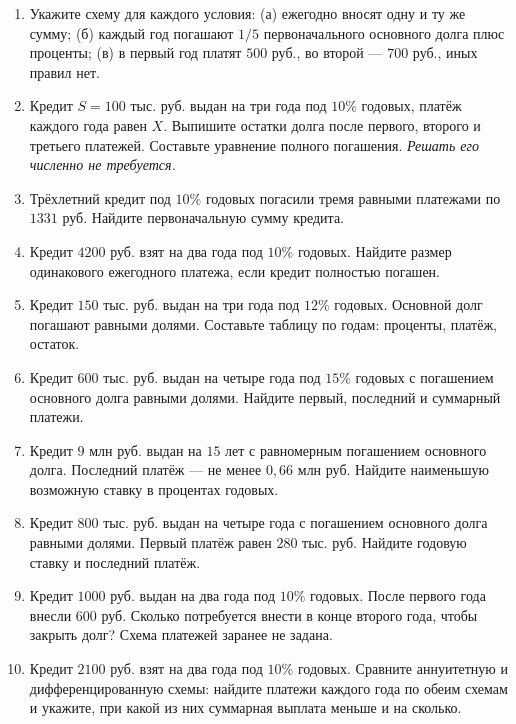 \documentclass[a4paper,12pt]{article}
\begin{document}
\begin{enumerate}[label=\textbf{\arabic*.},leftmargin=8mm,itemsep=8pt]
\item Укажите схему для каждого условия: (а) ежегодно вносят одну и ту же сумму; (б) каждый год погашают $1/5$ первоначального основного долга плюс проценты; (в) в первый год платят $500$ руб., во второй --- $700$ руб., иных правил нет.

\item Кредит $S=100$ тыс. руб. выдан на три года под $10\%$ годовых, платёж каждого года равен $X$. Выпишите остатки долга после первого, второго и третьего платежей. Составьте уравнение полного погашения. \textit{Решать его численно не требуется.}

\item Трёхлетний кредит под $10\%$ годовых погасили тремя равными платежами по $1331$ руб. Найдите первоначальную сумму кредита.

\item Кредит $4200$ руб. взят на два года под $10\%$ годовых. Найдите размер одинакового ежегодного платежа, если кредит полностью погашен.

\item Кредит $150$ тыс. руб. выдан на три года под $12\%$ годовых. Основной долг погашают равными долями. Составьте таблицу по годам: проценты, платёж, остаток.

\item Кредит $600$ тыс. руб. выдан на четыре года под $15\%$ годовых с погашением основного долга равными долями. Найдите первый, последний и суммарный платежи.

\item Кредит $9$ млн руб. выдан на $15$ лет с равномерным погашением основного долга. Последний платёж --- не менее $0{,}66$ млн руб. Найдите наименьшую возможную ставку в процентах годовых.

\item Кредит $800$ тыс. руб. выдан на четыре года с погашением основного долга равными долями. Первый платёж равен $280$ тыс. руб. Найдите годовую ставку и последний платёж.

\item Кредит $1000$ руб. выдан на два года под $10\%$ годовых. После первого года внесли $600$ руб. Сколько потребуется внести в конце второго года, чтобы закрыть долг? Схема платежей заранее не задана.

\item Кредит $2100$ руб. взят на два года под $10\%$ годовых. Сравните аннуитетную и дифференцированную схемы: найдите платежи каждого года по обеим схемам и укажите, при какой из них суммарная выплата меньше и на сколько.
\end{enumerate}
\end{document}
